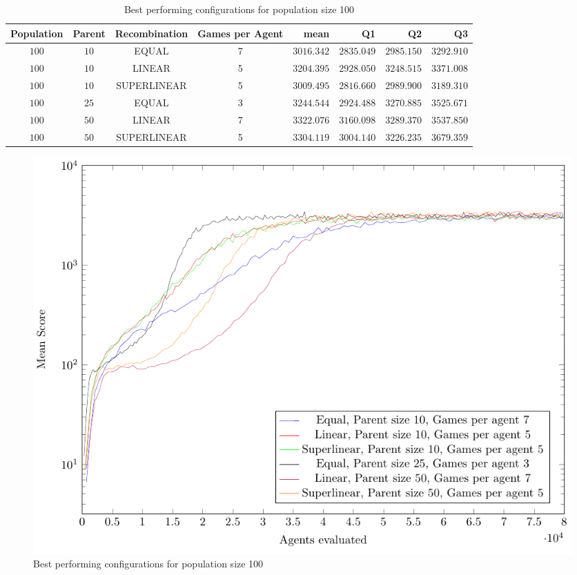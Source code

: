 \begin{table}[H]
\centering
\small
\begin{tabular}{c c c c r r r r}
Population & Parent & Recombination & Games per Agent & mean & Q1 & Q2 & Q3\\
\hline
$100$ & $10$ & EQUAL & 7 & $3016.342$ & $2835.049$ & $2985.150$ & $3292.910$\\
$100$ & $10$ & LINEAR & 5 & $3204.395$ & $2928.050$ & $3248.515$ & $3371.008$\\
$100$ & $10$ & SUPERLINEAR & 5 & $3009.495$ & $2816.660$ & $2989.900$ & $3189.310$\\
$100$ & $25$ & EQUAL & 3 & $3244.544$ & $2924.488$ & $3270.885$ & $3525.671$\\
$100$ & $50$ & LINEAR & 7 & $3322.076$ & $3160.098$ & $3289.370$ & $3537.850$\\
$100$ & $50$ & SUPERLINEAR & 5 & $3304.119$ & $3004.140$ & $3226.235$ & $3679.359$\\
\end{tabular}
\caption{Best performing configurations for population size 100}
\end{table}

\begin{figure}[H]
\centering
\includegraphics[scale=1]{data/cma_population_offspring/bestofeach_population/100x/PlotFile.pdf}
\caption{Best performing configurations for population size 100}
\end{figure}

\clearpage 

